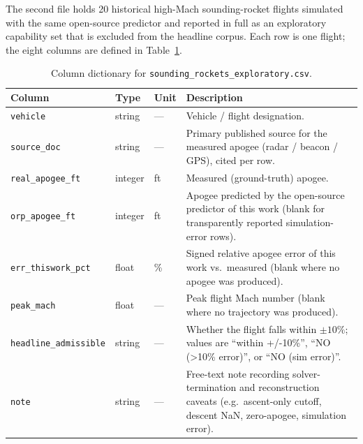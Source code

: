 The second file holds 20 historical high-Mach sounding-rocket flights
simulated with the same open-source predictor and reported in full as an
exploratory capability set that is excluded from the headline corpus. Each row
is one flight; the eight columns are defined in
Table~\ref{tab:cols_exploratory}.

\begin{table}[htbp]
\centering
\caption{Column dictionary for \texttt{sounding\_rockets\_exploratory.csv}.}
\label{tab:cols_exploratory}
\small
\begin{tabularx}{\textwidth}{@{}lll X@{}}
\toprule
Column & Type & Unit & Description \\
\midrule
\texttt{vehicle}             & string & ---  & Vehicle / flight designation. \\
\texttt{source\_doc}         & string & ---  & Primary published source for the measured apogee (radar / beacon / GPS), cited per row. \\
\texttt{real\_apogee\_ft}    & integer & ft  & Measured (ground-truth) apogee. \\
\texttt{orp\_apogee\_ft}     & integer & ft  & Apogee predicted by the open-source predictor of this work (blank for transparently reported simulation-error rows). \\
\texttt{err\_thiswork\_pct}  & float  & \%   & Signed relative apogee error of this work vs.\ measured (blank where no apogee was produced). \\
\texttt{peak\_mach}          & float  & ---  & Peak flight Mach number (blank where no trajectory was produced). \\
\texttt{headline\_admissible} & string & --- & Whether the flight falls within $\pm 10\%$; values are ``within +/-10\%'', ``NO (>10\% error)'', or ``NO (sim error)''. \\
\texttt{note}                & string & ---  & Free-text note recording solver-termination and reconstruction caveats (e.g.\ ascent-only cutoff, descent NaN, zero-apogee, simulation error). \\
\bottomrule
\end{tabularx}
\end{table}

